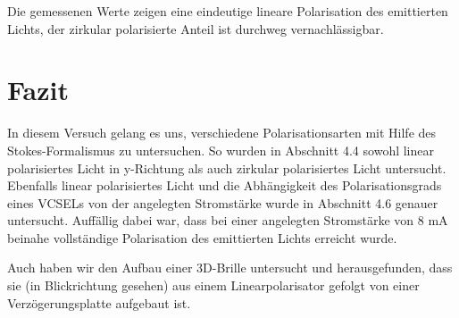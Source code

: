 \documentclass[bigchapter,colorback,accentcolor=tud4b,linedtoc,11pt]{tudreport}
\begin{document}
Die gemessenen Werte zeigen eine eindeutige lineare Polarisation des emittierten Lichts, der zirkular polarisierte Anteil ist durchweg vernachlässigbar.
\begin{center}
\begin{figure}[h]
\end{figure}
\end{center}

\chapter{Fazit}

In diesem Versuch gelang es uns, verschiedene Polarisationsarten mit Hilfe des Stokes-Formalismus zu untersuchen. So wurden in Abschnitt 4.4 sowohl linear polarisiertes Licht in y-Richtung als auch zirkular polarisiertes Licht untersucht. Ebenfalls linear polarisiertes Licht und die Abhängigkeit des Polarisationsgrads eines VCSELs von der angelegten Stromstärke wurde in Abschnitt 4.6 genauer untersucht. Auffällig dabei war, dass bei einer angelegten Stromstärke von 8 mA beinahe vollständige Polarisation des emittierten Lichts erreicht wurde.

Auch haben wir den Aufbau einer 3D-Brille untersucht und herausgefunden, dass sie (in Blickrichtung gesehen) aus einem Linearpolarisator gefolgt von einer Verzögerungsplatte aufgebaut ist.
\end{document}
